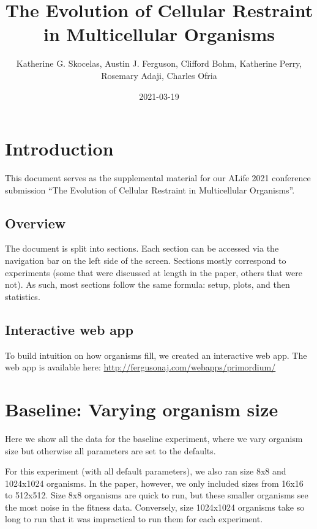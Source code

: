 \documentclass[]{book}
\title{The Evolution of Cellular Restraint in Multicellular Organisms}
\author{Katherine G. Skocelas, Austin J. Ferguson, Clifford Bohm, Katherine Perry, Rosemary Adaji, Charles Ofria}
\date{2021-03-19}
\begin{document}
\maketitle

{
\setcounter{tocdepth}{1}
\tableofcontents
}
\hypertarget{introduction}{%
\chapter{Introduction}\label{introduction}}

This document serves as the supplemental material for our ALife 2021 conference submission ``The Evolution of Cellular Restraint in Multicellular Organisms''.

\hypertarget{overview}{%
\section{Overview}\label{overview}}

The document is split into sections.
Each section can be accessed via the navigation bar on the left side of the screen.
Sections mostly correspond to experiments (some that were discussed at length in the paper, others that were not).
As such, most sections follow the same formula: setup, plots, and then statistics.

\hypertarget{interactive-web-app}{%
\section{Interactive web app}\label{interactive-web-app}}

To build intuition on how organisms fill, we created an interactive web app.
The web app is available here: \url{http://fergusonaj.com/webapps/primordium/}

\hypertarget{baseline-varying-organism-size}{%
\chapter{Baseline: Varying organism size}\label{baseline-varying-organism-size}}

Here we show all the data for the baseline experiment, where we vary organism size but otherwise all parameters are set to the defaults.

For this experiment (with all default parameters), we also ran size 8x8 and 1024x1024 organisms.
In the paper, however, we only included sizes from 16x16 to 512x512.
Size 8x8 organisms are quick to run, but these smaller organisms see the most noise in the fitness data.
Conversely, size 1024x1024 organisms take so long to run that it was impractical to run them for each experiment.
\end{document}
